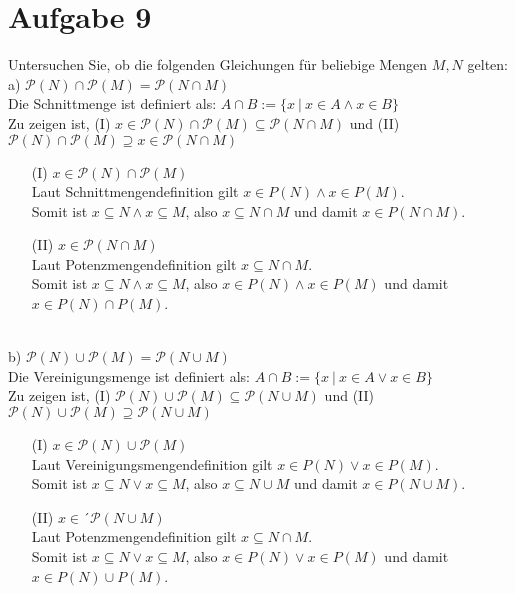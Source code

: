 \section*{Aufgabe 9}

Untersuchen Sie, ob die folgenden Gleichungen für beliebige Mengen $M, N$ gelten:\\

a) $\mathcal{P}(N) \cap \mathcal{P}(M) = \mathcal{P}(N \cap M)$\\

Die Schnittmenge ist definiert als: $A \cap B := \{x \ | \ x \in A \land x \in B \}$\\

Zu zeigen ist, (I) $x \in \mathcal{P}(N) \cap \mathcal{P}(M) \subseteq \mathcal{P}(N \cap M)$ und (II) $\mathcal{P}(N) \cap \mathcal{P}(M) \supseteq x \in \mathcal{P}(N \cap M)$

\begin{enumerate}[leftmargin=2em]
\item[(I)] $x \in \mathcal{P}(N) \cap \mathcal{P}(M)$\\
Laut Schnittmengendefinition gilt $x \in P(N) \land x \in P(M)$.\\
Somit ist $x \subseteq N \land x \subseteq M$, also $x \subseteq N \cap M$ und damit $x \in P(N \cap M)$.
\item[(II)] $x \in \mathcal{P}(N \cap M)$\\
Laut Potenzmengendefinition gilt $x \subseteq N \cap M$.\\
Somit ist $x \subseteq N \land x \subseteq M$, also $x \in P(N) \land x \in P(M)$ und damit $x \in P(N) \cap P(M)$.
\end{enumerate}\
\\

b) $\mathcal{P}(N) \cup \mathcal{P}(M) = \mathcal{P}(N \cup M)$\\

Die Vereinigungsmenge ist definiert als: $A \cap B := \{x \ | \ x \in A \lor x \in B \}$\\

Zu zeigen ist, (I) $\mathcal{P}(N) \cup \mathcal{P}(M) \subseteq \mathcal{P}(N \cup M)$ und (II) $\mathcal{P}(N) \cup \mathcal{P}(M) \supseteq \mathcal{P}(N \cup M)$

\begin{enumerate}[leftmargin=2em]
\item[(I)] $x \in \mathcal{P}(N) \cup \mathcal{P}(M)$\\
Laut Vereinigungsmengendefinition gilt $x \in P(N) \lor x \in P(M)$.\\
Somit ist $x \subseteq N \lor x \subseteq M$, also $x \subseteq N \cup M$ und damit $x \in P(N \cup M)$.
\item[(II)] $x \in´ \mathcal{P}(N \cup M)$\\
Laut Potenzmengendefinition gilt $x \subseteq N \cap M$.\\
Somit ist $x \subseteq N \lor x \subseteq M$, also $x \in P(N) \lor x \in P(M)$ und damit $x \in P(N) \cup P(M)$.
\end{enumerate}

\newpage